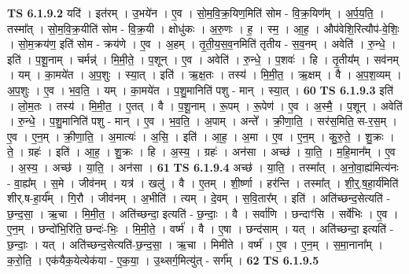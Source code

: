 \documentclass[17pt]{extarticle}
\begin{document}
                  \newline
                                \textbf{ TS 6.1.9.2} \newline
                  यदि॑ । इत॑रम् । उ॒भये॑न । ए॒व । सो॒म॒वि॒क्र॒यिण॒मिति॑ सोम - वि॒क्र॒यिण᳚म् । अ॒र्प॒य॒ति॒ । तस्मा᳚त् । सो॒म॒वि॒क्र॒यीति॑ सोम - वि॒क्र॒यी । क्षोधु॑कः । अ॒रु॒णः । ह॒ । स्म॒ । आ॒ह॒ । औप॑वेशि॒रित्यौप॑-वे॒शिः॒ । सो॒म॒क्रय॑ण॒ इति॑ सोम - क्रय॑णे । ए॒व । अ॒हम् । तृ॒ती॒य॒स॒व॒नमिति॑ तृतीय - स॒व॒नम् । अवेति॑ । रु॒न्धे॒ । इति॑ । प॒शू॒नाम् । चर्मन्न्॑ । मि॒मी॒ते॒ । प॒शून् । ए॒व । अवेति॑ । रु॒न्धे॒ । प॒शवः॑ । हि । तृ॒तीय᳚म् । सव॑नम् । यम् । का॒मये॑त । अ॒प॒शुः । स्या॒त् । इति॑ । ऋ॒क्ष॒तः । तस्य॑ । मि॒मी॒त॒ । ऋ॒क्षम् । वै । अ॒प॒श॒व्यम् । अ॒प॒शुः । ए॒व । भ॒व॒ति॒ । यम् । का॒मये॑त । प॒शु॒मानिति॑ पशु - मान् । स्या॒त् । \textbf{  60} \newline
                  \newline
                                \textbf{ TS 6.1.9.3} \newline
                  इति॑ । लो॒म॒तः । तस्य॑ । मि॒मी॒त॒ । ए॒तत् । वै । प॒शू॒नाम् । रू॒पम् । रू॒पेण॑ । ए॒व । अ॒स्मै॒ । प॒शून् । अवेति॑ । रु॒न्धे॒ । प॒शु॒मानिति॑ पशु - मान् । ए॒व । भ॒व॒ति॒ । अ॒पाम् । अन्ते᳚ । क्री॒णा॒ति॒ । सर॑स॒मिति॒ स-र॒स॒म् । ए॒व । ए॒न॒म् । क्री॒णा॒ति॒ । अ॒मात्यः॑ । अ॒सि॒ । इति॑ । आ॒ह॒ । अ॒मा । ए॒व । ए॒न॒म् । कु॒रु॒ते॒ । शु॒क्रः । ते॒ । ग्रहः॑ । इति॑ । आ॒ह॒ । शु॒क्रः । हि । अ॒स्य॒ । ग्रहः॑ । अन॑सा । अच्छ॑ । या॒ति॒ । म॒हि॒मान᳚म् । ए॒व । अ॒स्य॒ । अच्छ॑ । या॒ति॒ । अन॑सा । \textbf{  61} \newline
                  \newline
                                \textbf{ TS 6.1.9.4} \newline
                  अच्छ॑ । या॒ति॒ । तस्मा᳚त् । अ॒नो॒वा॒ह्य॑मित्य॑नः - वा॒ह्य᳚म् । स॒मे । जीव॑नम् । यत्र॑ । खलु॑ । वै । ए॒तम् । शी॒र्ष्णा । हर॑न्ति । तस्मा᳚त् । शी॒र्॒.ष॒हा॒र्य॑मिति॑ शीर्.ष-हा॒र्य᳚म् । गि॒रौ । जीव॑नम् । अ॒भीति॑ । त्यम् । दे॒वम् । स॒वि॒तार᳚म् । इति॑ । अति॑च्छन्द॒सेत्यति॑ - छ॒न्द॒सा॒ । ऋ॒चा । मि॒मी॒त॒ । अति॑च्छन्दा॒ इत्यति॑ - छ॒न्दाः॒ । वै । सर्वा॑णि । छन्दाꣳ॑सि । सर्वे॑भिः । ए॒व । ए॒न॒म् । छन्दो॑भि॒रिति॒ छन्दः॑-भिः॒ । मि॒मी॒ते॒ । वर्ष्म॑ । वै । ए॒षा । छन्द॑साम् । यत् । अति॑च्छन्दा॒ इत्यति॑ - छ॒न्दाः॒ । यत् । अति॑च्छन्द॒सेत्यति॑-छ॒न्द॒सा॒ । ऋ॒चा । मिमी॑ते । वर्ष्म॑ । ए॒व । ए॒न॒म् । स॒मा॒नाना᳚म् । क॒रो॒ति॒ । एक॑यैक॒येत्येक॑या - ए॒क॒या॒ । उ॒थ्सर्ग॒मित्यु॑त् - सर्ग᳚म् । \textbf{  62} \newline
                  \newline
                                \textbf{ TS 6.1.9.5} \newline
\end{document}
